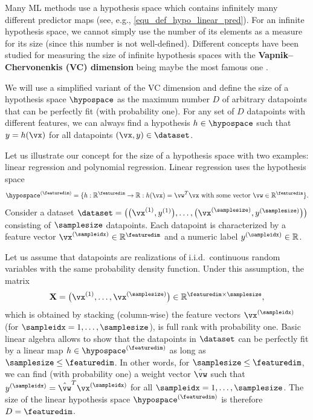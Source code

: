 \documentclass[12pt]{report}
\newcommand{\sizehypospace}{D}
\newcommand{\featurelen}{\featuredim}
\begin{document}
Many ML methods use a hypothesis space which contains 
infinitely many different predictor maps (see, e.g., \eqref{equ_def_hypo_linear_pred}). 
For an infinite hypothesis space, we cannot simply use the 
number of its elements as a measure for its size (since this number 
is not well-defined). Different concepts have been studied for 
measuring the size of infinite hypothesis spaces with the {\bf Vapnik–Chervonenkis (VC) dimension} 
being maybe the most famous one \cite{VapnikBook}. 

We will use a simplified variant of the VC dimension and define the 
size of a hypothesis space $\hypospace$ as the maximum number 
$\sizehypospace$ of arbitrary datapoints that can be perfectly fit 
(with probability one). For any set of $\sizehypospace$ datapoints 
with different features, we can always find a hypothesis $h \in \hypospace$ 
such that $y=h(\vx)$ for all datapoints $(\vx,y) \in \dataset$. 

Let us illustrate our concept for the size of a hypothesis space 
with two examples: linear regression and polynomial regression. 
Linear regression uses the hypothesis space 
$$\hypospace^{(\featuredim)} = \{ h: \mathbb{R}^{\featuredim} \rightarrow \mathbb{R}: h(\vx) = \vw^{T} \vx \mbox{ with some vector } \vw \in \mathbb{R}^{\featurelen}\}.$$ 
Consider a dataset $\dataset=\big( \big(\vx^{(1)} ,y^{(1)}\big),\ldots, \big(\vx^{(\samplesize)} ,y^{(\samplesize)}\big) \big)$ consisting of $\samplesize$ datapoints. 
Each datapoint is characterized by a feature 
vector $\vx^{(\sampleidx)} \in \mathbb{R}^{\featuredim}$ and a numeric label 
$y^{(\sampleidx)} \in \mathbb{R}$. 

Let us assume that datapoints are realizations of i.i.d.\ continuous random 
variables with the same probability density function. 
Under this assumption, the matrix 
$$\mathbf{X} = \big(\vx^{(1)},\ldots,\vx^{(\samplesize)}\big) \in \mathbb{R}^{\featuredim\times \samplesize},$$ 
which is obtained by stacking (column-wise) the feature vectors $\vx^{(\sampleidx)}$ (for $\sampleidx=1,\ldots,\samplesize$), 
is full rank with probability one. Basic linear algebra allows to show that 
the datapoints in $\dataset$ can be perfectly fit by a linear map $h \in \hypospace^{(\featuredim)}$ 
as long as $\samplesize \leq \featuredim$. In other words, for  $\samplesize \leq \featuredim$, we 
can find (with probability one) a weight vector $\hat{\vw}$ such that $y^{(\sampleidx)} = \hat{\vw}^{T} \vx^{(\sampleidx)}$ 
for all $\sampleidx=1,\ldots,\samplesize$. The size of the linear hypothesis space $\hypospace^{(\featuredim)}$ is therefore $\sizehypospace = \featuredim$. 
\end{document}
